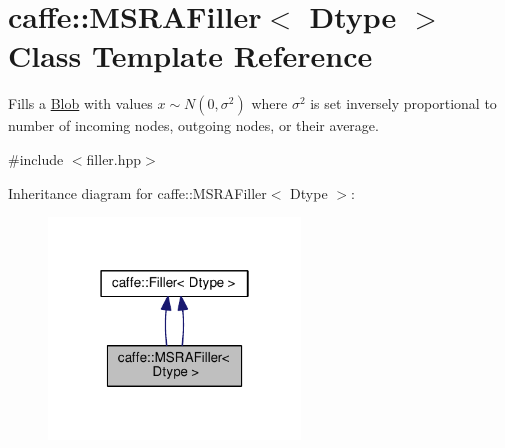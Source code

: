 \hypertarget{classcaffe_1_1_m_s_r_a_filler}{}\section{caffe\+:\+:M\+S\+R\+A\+Filler$<$ Dtype $>$ Class Template Reference}
\label{classcaffe_1_1_m_s_r_a_filler}


Fills a \mbox{\hyperlink{classcaffe_1_1_blob}{Blob}} with values $ x \sim N(0, \sigma^2) $ where $ \sigma^2 $ is set inversely proportional to number of incoming nodes, outgoing nodes, or their average.  




{\ttfamily \#include $<$filler.\+hpp$>$}



Inheritance diagram for caffe\+:\+:M\+S\+R\+A\+Filler$<$ Dtype $>$\+:
\nopagebreak
\begin{figure}[H]
\begin{center}
\leavevmode
\includegraphics[width=190pt]{classcaffe_1_1_m_s_r_a_filler__inherit__graph}
\end{center}
\end{figure}
